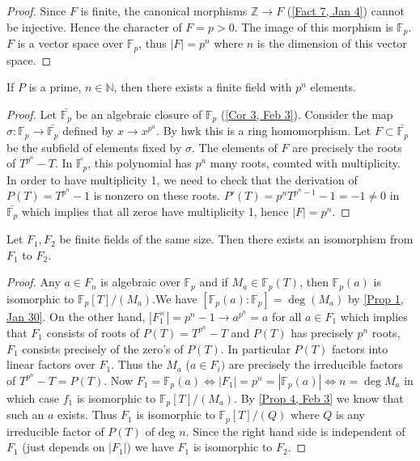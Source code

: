 \begin{proof}
Since $F$ is finite, the canonical morphisms $\mathbb{Z}\longrightarrow F$ (\ref{Fact 7, Jan 4}) cannot be injective. Hence the character of $F=p>0$. The image of this morphism is $\mathbb{F}_p$. $F$ is a vector space over $\mathbb{F}_p$, thus $|F|=p^n$ where $n$ is the dimension of this vector space.
\end{proof}
\begin{prop} \label{Prop 6, Feb 3}
If $P$ is a prime, $n\in\mathbb{N}$, then there exists a finite field with $p^n$ elements.
\end{prop}
\begin{proof} Let $\bar{\mathbb{F}_p}$ be an algebraic closure of $\mathbb{F}_p$ (\ref{Cor 3, Feb 3}). Consider the map $\sigma:\mathbb{F}_p\longrightarrow\bar{\mathbb{F}_p}$ defined by $x\longrightarrow x^{p^n}$. By hwk this is a ring homomorphism. Let $F\subset\bar{\mathbb{F}_p}$ be the subfield of elements fixed by $\sigma$. The elements of $F$ are precisely the roots of $T^{p^n}-T$. In $\bar{\mathbb{F}_p}$, this polynomial has $p^n$ many roots, counted with multiplicity. In order to have multiplicity 1, we need to check that the derivation of $P(T)=T^{p^n}-1$ is nonzero on these roots. $P'(T)=p^nT^{p^n-1}-1=-1\ne 0$ in $\bar{\mathbb{F}_p}$ which implies that all zeros have multiplicity 1, hence $|F|=p^n$.
\end{proof}
\begin{prop} \label{Prop 7, Feb 3}
Let $F_1,F_2$ be finite fields of the same size. Then there exists an isomorphism from $F_1$ to $F_2$.
\end{prop}
\begin{proof}
Any $a\in F_n$ is algebraic over $\mathbb{F}_p$ and if $M_a\in \mathbb{F}_p(T)$, then $\mathbb{F}_p(a)$ is isomorphic to $\mathbb{F}_p[T]/(M_a)$.We have $[\mathbb{F}_p(a):\mathbb{F}_p]=\deg(M_a)$ by \ref{Prop 1, Jan 30}. On the other hand, $|F_1^{\times}|=p^n-1\longrightarrow a^{p^n}=a$ for all $a\in F_1$ which implies that $F_1$ consists of roots of $P(T)=T^{p^n}-T$ and $P(T)$ has precisely $p^n$ roots, $F_1$ consists precisely of the zero's of $P(T)$. In particular $P(T)$ factors into linear factors over $F_1$.
Thus the $M_a$ ($a\in F_i)$ are precisely the irreducible factors of $T^{p^n}-T=P(T)$. Now $F_1=\mathbb{F}_p(a)\iff |F_1|=p^n=|\mathbb{F}_p(a)|\iff n=\deg M_a$ in which case $f_1$ is isomorphic to $\mathbb{F}_p[T]/(M_a).$ By \ref{Prop 4, Feb 3} we know that such an $a$ exists. Thus $F_1$ is isomorphic to $\mathbb{F}_p[T]/(Q)$ where $Q$ is any irreducible factor of $P(T)$ of deg $n$. Since the right hand side is independent of $F_1$ (just depends on $|F_1|$) we have $F_1$ is isomorphic to $F_2$.
\end{proof}

